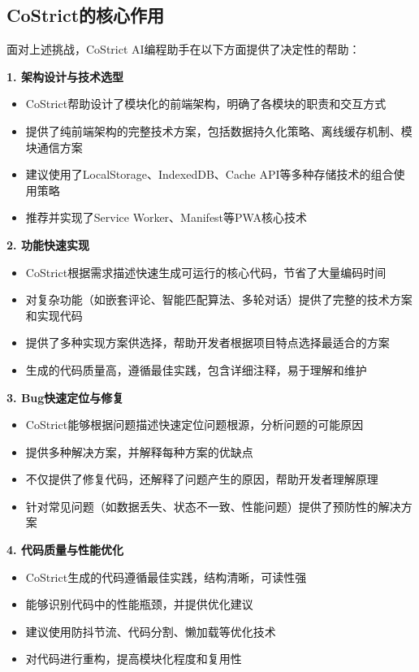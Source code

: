 ﻿\documentclass[12pt,a4paper]{article}
\begin{document}
\subsection{CoStrict的核心作用}

面对上述挑战，CoStrict AI编程助手在以下方面提供了决定性的帮助：

\textbf{1. 架构设计与技术选型}
\begin{itemize}
    \item CoStrict帮助设计了模块化的前端架构，明确了各模块的职责和交互方式
    \item 提供了纯前端架构的完整技术方案，包括数据持久化策略、离线缓存机制、模块通信方案
    \item 建议使用了LocalStorage、IndexedDB、Cache API等多种存储技术的组合使用策略
    \item 推荐并实现了Service Worker、Manifest等PWA核心技术
\end{itemize}

\textbf{2. 功能快速实现}
\begin{itemize}
    \item CoStrict根据需求描述快速生成可运行的核心代码，节省了大量编码时间
    \item 对复杂功能（如嵌套评论、智能匹配算法、多轮对话）提供了完整的技术方案和实现代码
    \item 提供了多种实现方案供选择，帮助开发者根据项目特点选择最适合的方案
    \item 生成的代码质量高，遵循最佳实践，包含详细注释，易于理解和维护
\end{itemize}

\textbf{3. Bug快速定位与修复}
\begin{itemize}
    \item CoStrict能够根据问题描述快速定位问题根源，分析问题的可能原因
    \item 提供多种解决方案，并解释每种方案的优缺点
    \item 不仅提供了修复代码，还解释了问题产生的原因，帮助开发者理解原理
    \item 针对常见问题（如数据丢失、状态不一致、性能问题）提供了预防性的解决方案
\end{itemize}

\textbf{4. 代码质量与性能优化}
\begin{itemize}
    \item CoStrict生成的代码遵循最佳实践，结构清晰，可读性强
    \item 能够识别代码中的性能瓶颈，并提供优化建议
    \item 建议使用防抖节流、代码分割、懒加载等优化技术
    \item 对代码进行重构，提高模块化程度和复用性
\end{itemize}
\end{document}
